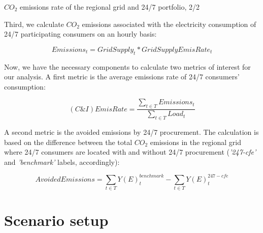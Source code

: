 \begin{frame}{$CO_2$ emissions rate of the regional grid and 24/7 portfolio, 2/2}

  {\small

  Third, we calculate {$CO_2$ emissions} associated with the electricity consumption of 
  24/7 participating consumers on an hourly basis:
  
  \begin{equation*}
  Emissions_t = GridSupply_t * GridSupplyEmisRate_t
  \end{equation*}

  Now, we have the necessary components to calculate two metrics of interest for our analysis. 
  A first metric is the \alert{average emissions rate of 24/7 consumers' consumption}:

  \begin{equation*}
    (C\&I)EmisRate = \frac{\sum_{t\in T} Emissions_t}{\sum_{t\in T} Load_t}
  \end{equation*}

  A second metric is the \alert{avoided emissions} by 24/7 procurement. The calculation is based on the 
  difference between the total {$CO_2$ emissions} in the regional grid where 24/7 consumers are located
  with and without 24/7 procurement (\emph{'247-cfe'} and \emph{'benchmark'} labels, accordingly):

  \begin{equation*}
    AvoidedEmissions = \sum_{t\in T} Y(E)_t^{benchmark} - \sum_{t\in T} Y(E)_t^{247-cfe}
  \end{equation*}
  }

\end{frame}

\section{Scenario setup}


